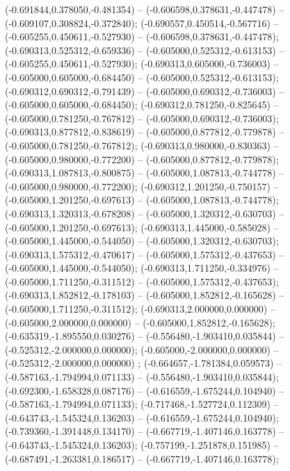  (-0.691844,0.378050,-0.481354) -- (-0.606598,0.378631,-0.447478) -- (-0.609107,0.308824,-0.372840);
 (-0.690557,0.450514,-0.567716) -- (-0.605255,0.450611,-0.527930) -- (-0.606598,0.378631,-0.447478);
 (-0.690313,0.525312,-0.659336) -- (-0.605000,0.525312,-0.613153) -- (-0.605255,0.450611,-0.527930);
 (-0.690313,0.605000,-0.736003) -- (-0.605000,0.605000,-0.684450) -- (-0.605000,0.525312,-0.613153);
 (-0.690312,0.690312,-0.791439) -- (-0.605000,0.690312,-0.736003) -- (-0.605000,0.605000,-0.684450);
 (-0.690312,0.781250,-0.825645) -- (-0.605000,0.781250,-0.767812) -- (-0.605000,0.690312,-0.736003);
 (-0.690313,0.877812,-0.838619) -- (-0.605000,0.877812,-0.779878) -- (-0.605000,0.781250,-0.767812);
 (-0.690313,0.980000,-0.830363) -- (-0.605000,0.980000,-0.772200) -- (-0.605000,0.877812,-0.779878);
 (-0.690313,1.087813,-0.800875) -- (-0.605000,1.087813,-0.744778) -- (-0.605000,0.980000,-0.772200);
 (-0.690312,1.201250,-0.750157) -- (-0.605000,1.201250,-0.697613) -- (-0.605000,1.087813,-0.744778);
 (-0.690313,1.320313,-0.678208) -- (-0.605000,1.320312,-0.630703) -- (-0.605000,1.201250,-0.697613);
 (-0.690313,1.445000,-0.585028) -- (-0.605000,1.445000,-0.544050) -- (-0.605000,1.320312,-0.630703);
 (-0.690313,1.575312,-0.470617) -- (-0.605000,1.575312,-0.437653) -- (-0.605000,1.445000,-0.544050);
 (-0.690313,1.711250,-0.334976) -- (-0.605000,1.711250,-0.311512) -- (-0.605000,1.575312,-0.437653);
 (-0.690313,1.852812,-0.178103) -- (-0.605000,1.852812,-0.165628) -- (-0.605000,1.711250,-0.311512);
 (-0.690313,2.000000,0.000000) -- (-0.605000,2.000000,0.000000) -- (-0.605000,1.852812,-0.165628);
 (-0.635319,-1.895550,0.030276) -- (-0.556480,-1.903410,0.035844) -- (-0.525312,-2.000000,0.000000);
 (-0.605000,-2.000000,0.000000) -- (-0.525312,-2.000000,0.000000) ;
 (-0.664657,-1.781384,0.059573) -- (-0.587163,-1.794994,0.071133) -- (-0.556480,-1.903410,0.035844);
 (-0.692300,-1.658328,0.087176) -- (-0.616559,-1.675244,0.104940) -- (-0.587163,-1.794994,0.071133);
 (-0.717468,-1.527724,0.112309) -- (-0.643743,-1.545324,0.136203) -- (-0.616559,-1.675244,0.104940);
 (-0.739360,-1.391448,0.134170) -- (-0.667719,-1.407146,0.163778) -- (-0.643743,-1.545324,0.136203);
 (-0.757199,-1.251878,0.151985) -- (-0.687491,-1.263381,0.186517) -- (-0.667719,-1.407146,0.163778);
